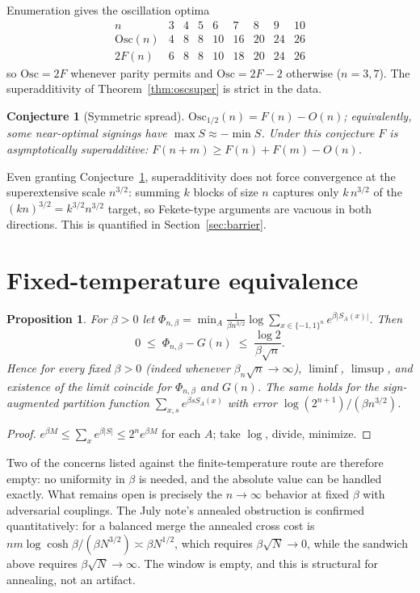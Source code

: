 \documentclass[11pt]{article}
\newtheorem{proposition}[theorem]{Proposition}
\newtheorem{conjecture}[theorem]{Conjecture}
\theoremstyle{remark}
\newcommand{\eps}{\{-1,1\}}
\newcommand{\Osc}{\mathrm{Osc}}
\begin{document}
Enumeration gives the oscillation optima
\[
\begin{array}{c|cccccccc}
n&3&4&5&6&7&8&9&10\\\hline
\Osc(n)&4&8&8&10&16&20&24&26\\
2F(n)&6&8&8&10&18&20&24&26
\end{array}
\]
so $\Osc=2F$ whenever parity permits and $\Osc=2F-2$ otherwise
($n=3,7$). The superadditivity of Theorem~\ref{thm:oscsuper} is
strict in the data.

\begin{conjecture}[Symmetric spread]\label{conj:spread}
$\Osc_{1/2}(n)=F(n)-O(n)$; equivalently, some near-optimal signings
have $\max S\approx-\min S$. Under this conjecture $F$ is
asymptotically superadditive:
$F(n+m)\ge F(n)+F(m)-O(n)$.
\end{conjecture}

Even granting Conjecture~\ref{conj:spread}, superadditivity does not
force convergence at the superextensive scale $n^{3/2}$: summing
$k$ blocks of size $n$ captures only $k\,n^{3/2}$ of the
$(kn)^{3/2}=k^{3/2}n^{3/2}$ target, so Fekete-type arguments are
vacuous in both directions. This is quantified in
Section~\ref{sec:barrier}.

\section{Fixed-temperature equivalence}\label{sec:beta}

\begin{proposition}\label{prop:beta}
For $\beta>0$ let
$\Phi_{n,\beta}
=\min_A\frac1{\beta n^{3/2}}\log\sum_{x\in\eps^n}e^{\beta|S_A(x)|}$.
Then
\[
 0\;\le\;\Phi_{n,\beta}-G(n)\;\le\;\frac{\log2}{\beta\sqrt n}.
\]
Hence for every fixed $\beta>0$ (indeed whenever
$\beta_n\sqrt n\to\infty$), $\liminf$, $\limsup$, and existence of the
limit coincide for $\Phi_{n,\beta}$ and $G(n)$. The same holds for the
sign-augmented partition function
$\sum_{x,s}e^{\beta sS_A(x)}$ with error $\log(2^{n+1})/(\beta n^{3/2})$.
\end{proposition}
\begin{proof}
$e^{\beta M}\le\sum_xe^{\beta|S|}\le2^ne^{\beta M}$ for each $A$; take
$\log$, divide, minimize.
\end{proof}

Two of the concerns listed against the finite-temperature route are
therefore empty: no uniformity in $\beta$ is needed, and the absolute
value can be handled exactly. What remains open is precisely the
$n\to\infty$ behavior at fixed $\beta$ with adversarial couplings. The
July note's annealed obstruction is confirmed quantitatively: for a
balanced merge the annealed cross cost is
$nm\log\cosh\beta/(\beta N^{3/2})\asymp\beta N^{1/2}$, which requires
$\beta\sqrt N\to0$, while the sandwich above requires
$\beta\sqrt N\to\infty$. The window is empty, and this is structural
for annealing, not an artifact.
\end{document}
